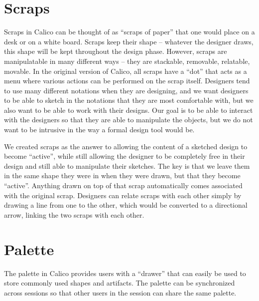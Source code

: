 \section{Scraps}
Scraps in Calico can be thought of as ``scraps of paper'' that one would place on a desk or on a white board.
Scraps keep their shape -- whatever the designer draws, this shape will be kept throughout the design phase.
However, scraps are manipulatable in many different ways -- they are stackable, removable, relatable, movable. 
In the original version of Calico, all scraps have a ``dot'' that acts as a menu where various actions can be performed on the scrap itself.
Designers tend to use many different notations when they are designing, and we want designers to be able to sketch in the notations that they are most comfortable with, but we also want to be able to work with their designs.
Our goal is to be able to interact with the designers so that they are able to manipulate the objects, but we do not want to be intrusive in the way a formal design tool would be.

We created scraps as the answer to allowing the content of a sketched design to become ``active'', while still allowing the designer to be completely free in their design and still able to manipulate their sketches.
The key is that we leave them in the same shape they were in when they were drawn, but that they become ``active''. 
Anything drawn on top of that scrap automatically comes associated with the original scrap.
Designers can relate scraps with each other simply by drawing a line from one to the other, which would be converted to a directional arrow, linking the two scraps with each other.

\section{Palette}
The palette in Calico provides users with a ``drawer'' that can easily be used to store commonly used shapes and artifacts.
The palette can be synchronized across sessions so that other users in the session can share the same palette.